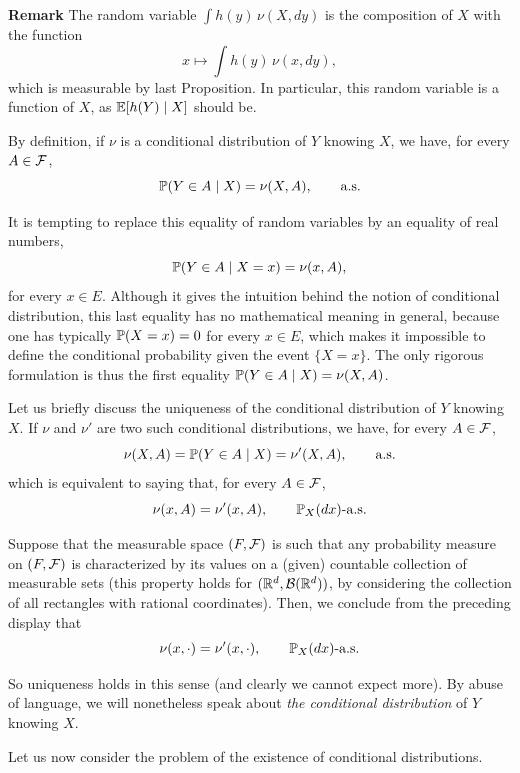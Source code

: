 \documentclass[../Main.tex]{subfiles}
\begin{document}
\textbf{Remark}
The random variable $\int h(y)\,\nu(X,dy)$ is the composition of $X$ with the function
\[ x \mapsto \int h(y)\,\nu(x,dy), \]
which is measurable by last Proposition. In particular, this random variable is a function of $X$, as $\mathbb{E}[h(Y) \mid X]$ should be.

By definition, if $\nu$ is a conditional distribution of $Y$ knowing $X$, we have, for every $A \in \mathcal{F}$,
\[ \mathbb{P}(Y \in A \mid X) = \nu(X,A), \qquad \text{a.s.} \]

It is tempting to replace this equality of random variables by an equality of real numbers,
\[ \mathbb{P}(Y \in A \mid X = x) = \nu(x,A), \]
for every $x \in E$. Although it gives the intuition behind the notion of conditional distribution, this last equality has no mathematical meaning in general, because one has typically $\mathbb{P}(X = x) = 0$ for every $x \in E$, which makes it impossible to define the conditional probability given the event $\{X = x\}$. The only rigorous formulation is thus the first equality $\mathbb{P}(Y \in A \mid X) = \nu(X,A)$.

Let us briefly discuss the uniqueness of the conditional distribution of $Y$ knowing $X$. If $\nu$ and $\nu'$ are two such conditional distributions, we have, for every $A \in \mathcal{F}$,
\[ \nu(X,A) = \mathbb{P}(Y \in A \mid X) = \nu'(X,A), \qquad \text{a.s.} \]
which is equivalent to saying that, for every $A \in \mathcal{F}$,
\[\nu(x,A) = \nu'(x,A), \qquad \mathbb{P}_X(dx)\text{-a.s.}\]

Suppose that the measurable space $(F,\mathcal{F})$ is such that any probability measure on $(F,\mathcal{F})$ is characterized by its values on a (given) countable collection of measurable sets (this property holds for $(\mathbb{R}^d,\mathcal{B}(\mathbb{R}^d))$, by considering the collection of all rectangles with rational coordinates). Then, we conclude from the preceding display that
\[\nu(x,\cdot) = \nu'(x,\cdot), \qquad \mathbb{P}_X(dx)\text{-a.s.}\]

So uniqueness holds in this sense (and clearly we cannot expect more). By abuse of language, we will nonetheless speak about \emph{the conditional distribution} of $Y$ knowing $X$.

Let us now consider the problem of the existence of conditional distributions.

\end{document}
